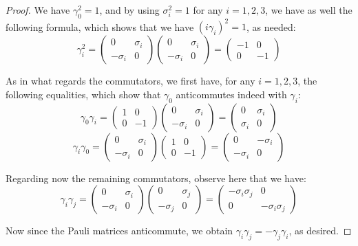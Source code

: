 \documentclass[12pt]{amsbook}
\begin{document}
\begin{proof}
We have $\gamma_0^2=1$, and by using $\sigma_i^2=1$ for any $i=1,2,3$, we have as well the following formula, which shows that we have $(i\gamma_i)^2=1$, as needed:
$$\gamma_i^2=\begin{pmatrix}0&\sigma_i\\-\sigma_i&0\end{pmatrix}\begin{pmatrix}0&\sigma_i\\-\sigma_i&0\end{pmatrix}=\begin{pmatrix}-1&0\\0&-1\end{pmatrix}$$

As in what regards the commutators, we first have, for any $i=1,2,3$, the following equalities, which show that $\gamma_0$ anticommutes indeed with $\gamma_i$:
$$\gamma_0\gamma_i=\begin{pmatrix}1&0\\0&-1\end{pmatrix}\begin{pmatrix}0&\sigma_i\\-\sigma_i&0\end{pmatrix}=\begin{pmatrix}0&\sigma_i\\\sigma_i&0\end{pmatrix}$$
$$\gamma_i\gamma_0=\begin{pmatrix}0&\sigma_i\\-\sigma_i&0\end{pmatrix}\begin{pmatrix}1&0\\0&-1\end{pmatrix}=\begin{pmatrix}0&-\sigma_i\\-\sigma_i&0\end{pmatrix}$$

Regarding now the remaining commutators, observe here that we have:
$$\gamma_i\gamma_j=\begin{pmatrix}0&\sigma_i\\-\sigma_i&0\end{pmatrix}
\begin{pmatrix}0&\sigma_j\\-\sigma_j&0\end{pmatrix}
=\begin{pmatrix}-\sigma_i\sigma_j&0\\0&-\sigma_i\sigma_j\end{pmatrix}$$

Now since the Pauli matrices anticommute, we obtain $\gamma_i\gamma_j=-\gamma_j\gamma_i$, as desired.
\end{proof}
\end{document}
